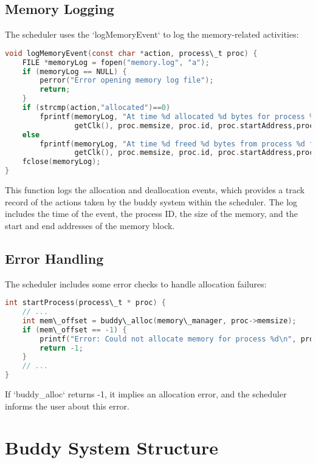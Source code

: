 \documentclass{article}
\begin{document}
\subsection{Memory Logging}

The scheduler uses the `logMemoryEvent` to log the memory-related activities:

\begin{lstlisting}[language=C, caption=Memory Event Logging in scheduler.c]
void logMemoryEvent(const char *action, process\_t proc) {
    FILE *memoryLog = fopen("memory.log", "a");
    if (memoryLog == NULL) {
        perror("Error opening memory log file");
        return;
    }
    if (strcmp(action,"allocated")==0)
        fprintf(memoryLog, "At time %d allocated %d bytes for process %d from %d to %d\n",
                getClk(), proc.memsize, proc.id, proc.startAddress,proc.startAddress + buddy\_size(memory\_manager, proc.startAddress) - 1);
    else
        fprintf(memoryLog, "At time %d freed %d bytes from process %d from %d to %d\n",
                getClk(), proc.memsize, proc.id, proc.startAddress,proc.startAddress + buddy\_size(memory\_manager, proc.startAddress) - 1);
    fclose(memoryLog);
}
\end{lstlisting}

This function logs the allocation and deallocation events, which provides a track record of the actions taken by the buddy system within the scheduler. The log includes the time of the event, the process ID, the size of the memory, and the start and end addresses of the memory block.

\subsection{Error Handling}
The scheduler includes some error checks to handle allocation failures:

\begin{lstlisting}[language=C, caption=Error handling for memory allocation in scheduler.c]
int startProcess(process\_t * proc) {
    // ...
    int mem\_offset = buddy\_alloc(memory\_manager, proc->memsize);
    if (mem\_offset == -1) {
        printf("Error: Could not allocate memory for process %d\n", proc->id);
        return -1;
    }
    // ...
}
\end{lstlisting}
If `buddy\_alloc` returns -1, it implies an allocation error, and the scheduler informs the user about this error.

\section{Buddy System Structure}
\end{document}
